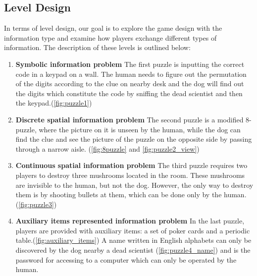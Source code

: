\documentclass{sigchi}
\begin{document}
\subsection{Level Design}
In terms of level design, our goal is to explore the game design with the information type and examine how players exchange different types of information. The description of these levels is outlined below:
\begin{enumerate}
\item \textbf{Symbolic information problem}\newline
The first puzzle is inputting the correct code in a keypad on a wall. The human needs to figure out the permutation of the digits according to the clue on nearby desk and the dog will find out the digits which constitute the code by sniffing the dead scientist and then the keypad.(\autoref{fig:puzzle1})
\item \textbf{Discrete spatial information problem}\newline
The second puzzle is a modified 8-puzzle\cite{8puzzle}, where the picture on it is unseen by the human, while the dog can find the clue and see the picture of the puzzle on the opposite side by passing through a narrow aisle. (\autoref{fig:8puzzle} and \autoref{fig:puzzle2_view})
\item \textbf{Continuous spatial information problem}\newline
The third puzzle requires two players to destroy three mushrooms located in the room. These mushrooms are invisible to the human, but not the dog. However, the only way to destroy them is by shooting bullets at them, which can be done only by the human.(\autoref{fig:puzzle3})
\item \textbf{Auxiliary items represented information problem}\newline
In the last puzzle, players are provided with auxiliary items: a set of poker cards and a periodic table.(\autoref{fig:auxiliary_items}) A name written in English alphabets can only be discovered by the dog nearby a dead scientist (\autoref{fig:puzzle4_name}) and is the password for accessing to a computer which can only be operated by the human. 
\end{enumerate}
\end{document}
